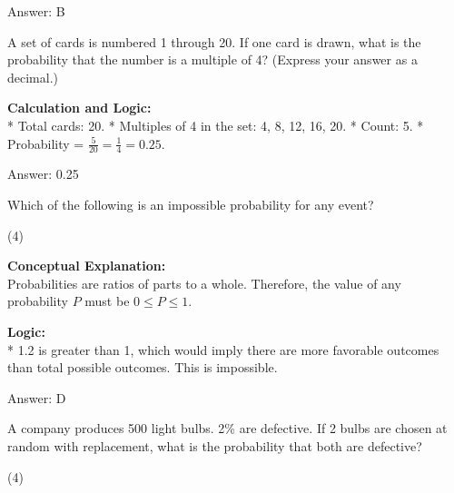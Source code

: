 \documentclass[11pt,paper=a4,answers]{exam}
\begin{document}
\begin{questions}
\begin{solution}
\vspace{30pt}

Answer: \colorbox{yellow!100}{B}
\end{solution}

\vspace{60pt}

\question
A set of cards is numbered 1 through 20. If one card is drawn, what is the probability that the number is a multiple of 4? (Express your answer as a decimal.)

\begin{solution}
\textbf{Calculation and Logic:} \\
* Total cards: 20.
* Multiples of 4 in the set: 4, 8, 12, 16, 20.
* Count: 5.
* Probability = $\frac{5}{20} = \frac{1}{4} = 0.25$.

\vspace{30pt}

Answer: \colorbox{yellow!100}{0.25}
\end{solution}

\vspace{60pt}

\question
Which of the following is an impossible probability for any event?
\begin{tasks}(4)
\end{tasks}

\begin{solution}
\textbf{Conceptual Explanation:} \\
Probabilities are ratios of parts to a whole. Therefore, the value of any probability $P$ must be $0 \le P \le 1$.

\vspace{30pt}

\textbf{Logic:} \\
* 1.2 is greater than 1, which would imply there are more favorable outcomes than total possible outcomes. This is impossible.

\vspace{30pt}

Answer: \colorbox{yellow!100}{D}
\end{solution}

\vspace{60pt}

\question
A company produces 500 light bulbs. 2\% are defective. If 2 bulbs are chosen at random with replacement, what is the probability that both are defective?
\begin{tasks}(4)
\end{tasks}


\end{questions}
\end{document}
